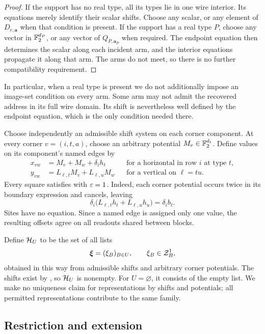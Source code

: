 \begin{proof}
If the support has no real type, all its types lie in one wire interior.
Its equations merely identify their scalar shifts. Choose any scalar,
or any element of \(D_{e,\mathbf a}\) when that condition is present.
If the support has a real type \(P\), choose any vector in
\(\mathbb F_2^{d_P}\), or any vector of \(Q_{P,\mathbf a_P}\) when required.
The endpoint equation then determines the scalar along each incident
arm, and the interior equations propagate it along that arm. The arms
do not meet, so there is no further compatibility requirement.
\end{proof}

In particular, when a real type is present we do not additionally impose
an image-set condition on every arm. Some arm may not admit the
recovered address in its full wire domain. Its shift is nevertheless
well defined by the endpoint equation, which is the only condition
needed there.

Choose independently an admissible shift system on each corner
component. At every corner \(v=(i,t,a)\), choose an arbitrary potential
\(M_v\in\mathbb F_2^{d_t}\). Define values on its component's named edges by
\begin{equation}
\begin{aligned}
 x_{vw}&=M_v+M_w+\delta_i h_t
 &&\text{for a horizontal in row \(i\) at type \(t\)},\\
 y_{vw}&=L_{\ell,t}M_v+L_{\ell,u}M_w
 &&\text{for a vertical on \(\ell=tu\)}.
\end{aligned}
\label{offset:eq-potentials}
\end{equation}
Every square satisfies  with \(\varepsilon=1\).
Indeed, each corner potential occurs twice in its boundary expression
and cancels, leaving
\[
 \delta_i\bigl(L_{\ell,t}h_t+L_{\ell,u}h_u\bigr)
       =\delta_i b_\ell.
\]
Sites have no equation. Since a named edge is assigned only one value,
the resulting offsets agree on all readouts shared between blocks.

Define \(\mathcal H_U\) to be the set of all lists
\[
  \boldsymbol\xi=(\xi_B)_{B\in U},
  \qquad \xi_B\in\mathcal Z_B^1,
\]
obtained in this way from admissible shifts and arbitrary corner
potentials. The shifts exist by , so
\(\mathcal H_U\) is nonempty. For \(U=\varnothing\), it consists of the empty
list. We make no uniqueness claim for representations by shifts and
potentials; all permitted representations contribute to the same family.

\subsection{Restriction and extension}
\label{offset:restriction}

